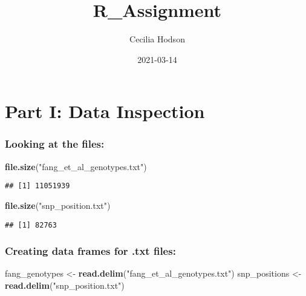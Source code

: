 \documentclass[
]{article}
\title{R\_Assignment}
\author{Cecilia Hodson}
\date{2021-03-14}
\newenvironment{Shaded}{\begin{snugshade}}{\end{snugshade}}
\newcommand{\KeywordTok}[1]{\textcolor[rgb]{0.13,0.29,0.53}{\textbf{#1}}}
\newcommand{\NormalTok}[1]{#1}
\newcommand{\StringTok}[1]{\textcolor[rgb]{0.31,0.60,0.02}{#1}}
\begin{document}
\maketitle

\hypertarget{part-i-data-inspection}{%
\section{Part I: Data Inspection}\label{part-i-data-inspection}}

\hypertarget{looking-at-the-files}{%
\subsubsection{Looking at the files:}\label{looking-at-the-files}}

\begin{Shaded}
\begin{Highlighting}[]
\KeywordTok{file.size}\NormalTok{(}\StringTok{"fang_et_al_genotypes.txt"}\NormalTok{)}
\end{Highlighting}
\end{Shaded}

\begin{verbatim}
## [1] 11051939
\end{verbatim}

\begin{Shaded}
\begin{Highlighting}[]
\KeywordTok{file.size}\NormalTok{(}\StringTok{"snp_position.txt"}\NormalTok{)}
\end{Highlighting}
\end{Shaded}

\begin{verbatim}
## [1] 82763
\end{verbatim}

\hypertarget{creating-data-frames-for-.txt-files}{%
\subsubsection{Creating data frames for .txt
files:}\label{creating-data-frames-for-.txt-files}}

\begin{Shaded}
\begin{Highlighting}[]
\NormalTok{fang_genotypes <-}\StringTok{ }\KeywordTok{read.delim}\NormalTok{(}\StringTok{"fang_et_al_genotypes.txt"}\NormalTok{)}
\NormalTok{snp_positions <-}\StringTok{ }\KeywordTok{read.delim}\NormalTok{(}\StringTok{"snp_position.txt"}\NormalTok{)}
\end{Highlighting}
\end{Shaded}
\end{document}
